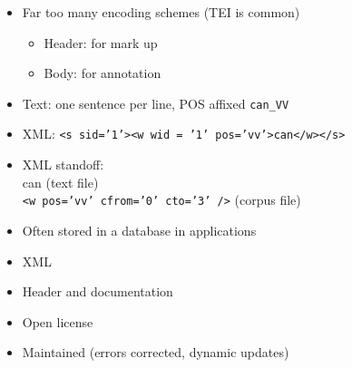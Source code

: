 \documentclass[a4paper,landscape,headrule,footrule,xetex]{foils}
\begin{document}
\begin{itemize}
\item Far too many encoding schemes (TEI is common)
  \begin{itemize}
  \item Header: for mark up
  \item Body: for annotation
  \end{itemize}
\item Text: one sentence per line, POS affixed \texttt{can\_VV}
\item XML: \texttt{<s sid='1'><w wid = '1' pos='vv'>can</w></s>}
\item XML standoff: 
  \\ can \hfill (text file)
  \\ \texttt{<w pos='vv' cfrom='0' cto='3' />} \hfill (corpus file)
\item Often stored in a database in applications

\end{itemize}


\begin{itemize}
\item XML
\item Header and documentation
\item Open license
\item Maintained (errors corrected, dynamic updates)
\end{itemize}

\end{document}
